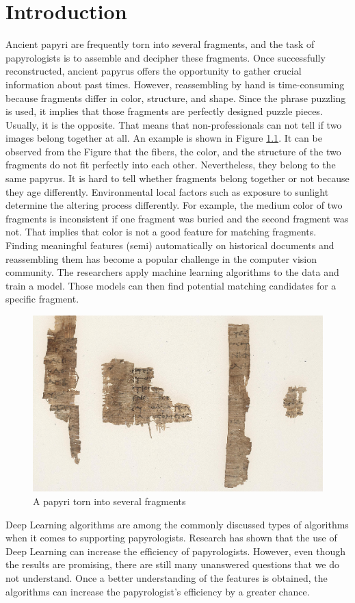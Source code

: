 \chapter{Introduction}
\label{chap:intro}
Ancient papyri are \cite{Pirrone21} frequently torn into several fragments, and the task of papyrologists is to assemble
and decipher these fragments. Once successfully reconstructed, ancient papyrus offers the opportunity
to gather crucial information about past times. However, reassembling by hand is time-consuming
because fragments differ in color, structure, and shape. Since the phrase puzzling is used, it implies that those fragments are perfectly designed puzzle pieces. Usually, it is the opposite. That means that non-professionals can not tell if two images belong together at all. An example is shown in Figure \ref{fig:papyri_sample}. It can be observed from the Figure that the fibers, the color, and the structure of the two fragments do not fit perfectly into each other. Nevertheless, they belong to the same papyrus. It is hard to tell whether fragments belong together or not because they age differently. Environmental local factors such as exposure to sunlight determine the altering process differently. For example, the medium color of two fragments is inconsistent if one fragment was buried and the second fragment was not. That implies that color is not a good feature for matching fragments.\\
Finding meaningful features (semi) automatically on historical documents and reassembling them has become a popular challenge in the computer vision community. The researchers apply machine learning algorithms to the data and train a model. Those models can then find potential matching candidates for a specific fragment.
\begin{figure}[t]
	\label{fig:papyri_sample}
	\includegraphics[width=\textwidth]{figures/papyri_sample.jpg}
	\caption{A papyri torn into several fragments}
\end{figure}
Deep Learning algorithms are among the commonly discussed types of algorithms when it comes to supporting papyrologists. Research has shown that the use of Deep Learning can increase the efficiency of papyrologists. However, even though the results are promising, there are still many unanswered questions that we do not understand. Once a better understanding of the features is obtained, the algorithms can increase the papyrologist's efficiency by a greater chance. 


